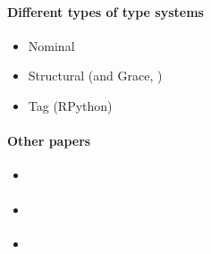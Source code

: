 \paragraph{Different types of type systems}


\begin{itemize}
    \item Nominal \cite{Muehlboeck2017}
    \item Structural \cite{Richards2017} (and Grace, \cite{Boyland2014})
    \item Tag (RPython) \cite{Greenman2017}
\end{itemize}

\paragraph{Other papers}

\begin{itemize}
    \item \cite{Bloom2009}
    \item \cite{Castagna2017}
    \item \cite{Stulova2016}
\end{itemize}
